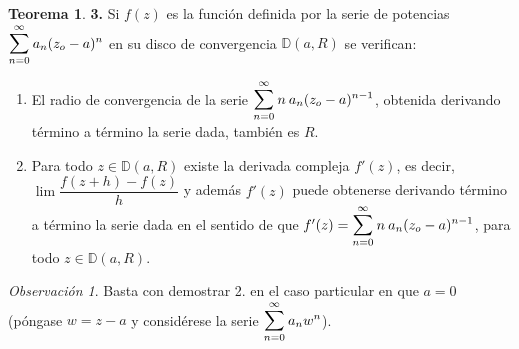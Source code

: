 \documentclass[12pt,twoside]{report}
\theoremstyle{azul}
\theoremstyle{azul2}
\theoremstyle{plain}
\theoremstyle{definition}
\newtheorem*{theo}{Teorema}
\theoremstyle{remark}
\newtheorem*{obs}{Observación}
\begin{document}
\begin{theo} \textbf{3.} Si $f(z)$ es la funci{\'o}n definida por la serie de potencias $\displaystyle \mathlarger{\sum}_{n=0}^{\infty} \: a_n (z_o - a)^n$ en su disco de convergencia $\mathbb{D}(a,R)$ se verifican:
\begin{enumerate}
    \item El radio de convergencia de la serie $\displaystyle \mathlarger{\sum}_{n=0}^{\infty} \: n \: a_n (z_o - a)^{n-1}$, obtenida derivando t{\'e}rmino a t{\'e}rmino la serie dada, tambi{\'e}n es $R$.
    \item Para todo $z \in \mathbb{D}(a,R)$ existe la derivada compleja $f'(z)$, es decir, $\lim \dfrac{f(z+h) - f(z)}{h}$ y adem{\'a}s $f'(z)$ puede obtenerse derivando t{\'e}rmino a t{\'e}rmino la serie dada en el sentido de que $f'(z)=\displaystyle \mathlarger{\sum}_{n=0}^{\infty} \:n \: a_n (z_o - a)^{n-1}$, para todo $z \in \mathbb{D}(a,R)$.
\end{enumerate}
\end{theo}
\begin{obs}
Basta con demostrar 2. en el caso particular en que $a=0$ (p{\'o}ngase $w=z-a$ y consid{\'e}rese la serie $\displaystyle \mathlarger{\sum}_{n=0}^{\infty} \: a_n w^{n}$).
\end{obs}
\end{document}
